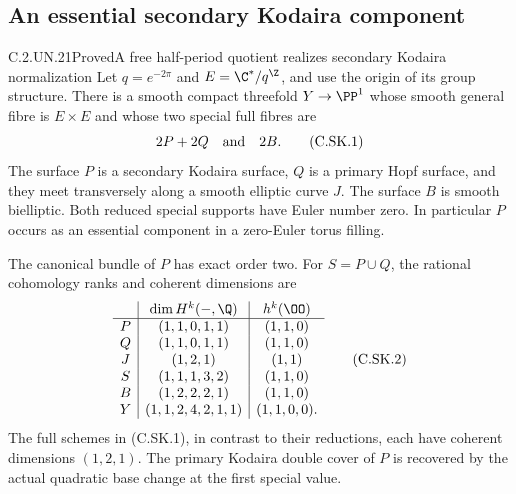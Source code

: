 \subsection{An essential secondary Kodaira component}

\begin{statement}{C.2.UN.21}{Proved}{A free half-period quotient realizes secondary Kodaira normalization}
Let $q=e^{-2\pi}$ and $E=\C^*/q^{\Z}$, and use the
origin of its group structure. There is a smooth compact
threefold $Y\to\PP^1$ whose smooth general fibre is
$E\times E$ and whose two special full fibres are
\[
                        2P+2Q\quad\hbox{and}\quad 2B.
                                                            \tag{C.SK.1}
\]
The surface $P$ is a secondary Kodaira surface, $Q$ is
a primary Hopf surface, and they meet transversely along
a smooth elliptic curve $J$. The surface $B$ is smooth
bielliptic. Both reduced special supports have Euler
number zero. In particular $P$ occurs as an essential
component in a zero-Euler torus filling.

The canonical bundle of $P$ has exact order two. For
$S=P\cup Q$, the rational cohomology ranks and coherent
dimensions are
\[
 \begin{array}{c|c|c}
 &\dim H^k(-,\Q)&h^k(\OO)\\ \hline
 P&(1,1,0,1,1)&(1,1,0)\\
 Q&(1,1,0,1,1)&(1,1,0)\\
 J&(1,2,1)&(1,1)\\
 S&(1,1,1,3,2)&(1,1,0)\\
 B&(1,2,2,2,1)&(1,1,0)\\
 Y&(1,1,2,4,2,1,1)&(1,1,0,0).
 \end{array}                                             \tag{C.SK.2}
\]
The full schemes in (C.SK.1), in contrast to their
reductions, each have coherent dimensions $(1,2,1)$.
The primary Kodaira double cover of $P$ is recovered
by the actual quadratic base change at the first
special value.
\end{statement}
